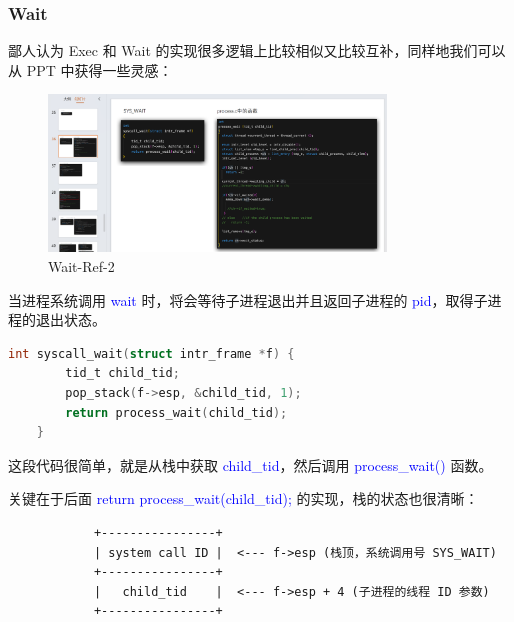 \documentclass[14pt,a4paper,UTF8,twoside]{article}
\renewcommand{\texttt}[1]{\textcolor{blue}{\ttfamily #1}}
\begin{document}
\subsubsection{Wait}

鄙人认为 Exec 和 Wait 的实现很多逻辑上比较相似又比较互补，同样地我们可以从 PPT 中获得一些灵感：

\begin{figure}[H]
    \centering
    \includegraphics[width=0.8\textwidth]{img6/waitref2.png}
    \caption{Wait-Ref-2}
    \label{fig:wait}
\end{figure}

\begin{mdframed}[backgroundcolor=gray!10, linewidth=0.5pt, roundcorner=5pt]
    当进程系统调用 \texttt{wait} 时，将会等待子进程退出并且返回子进程的 \texttt{pid}，取得子进程的退出状态。
\end{mdframed}

\begin{lstlisting}[language=C, title = syscall\_wait()]
    int syscall_wait(struct intr_frame *f) {
        tid_t child_tid;
        pop_stack(f->esp, &child_tid, 1);
        return process_wait(child_tid);
    }
\end{lstlisting}

这段代码很简单，就是从栈中获取 \texttt{child\_tid}，然后调用 \texttt{process\_wait()} 函数。

关键在于后面 \texttt{return process\_wait(child\_tid);} 的实现，栈的状态也很清晰：

\begin{lstlisting}
            +----------------+
            | system call ID |  <--- f->esp (栈顶，系统调用号 SYS_WAIT)
            +----------------+
            |   child_tid    |  <--- f->esp + 4 (子进程的线程 ID 参数)
            +----------------+    
\end{lstlisting}
\end{document}
